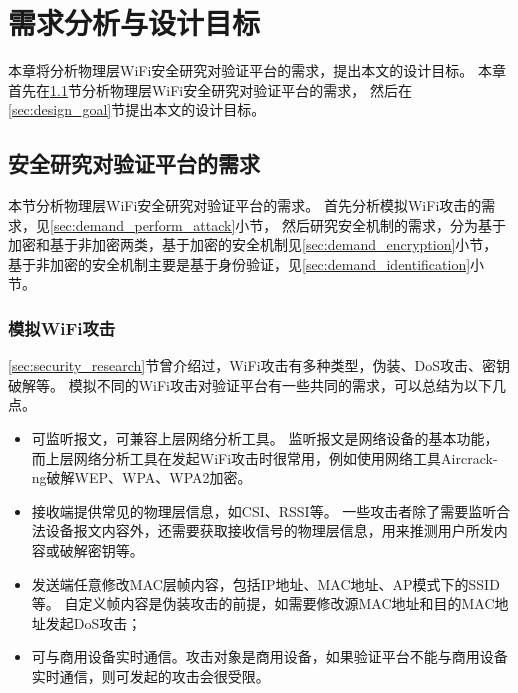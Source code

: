 
\chapter{需求分析与设计目标}
本章将分析物理层WiFi安全研究对验证平台的需求，提出本文的设计目标。
本章首先在\ref{sec:platform_demand}节分析物理层WiFi安全研究对验证平台的需求，
然后在\ref{sec:design_goal}节提出本文的设计目标。

	\section{安全研究对验证平台的需求}\label{sec:platform_demand}
	本节分析物理层WiFi安全研究对验证平台的需求。
	首先分析模拟WiFi攻击的需求，见\ref{sec:demand_perform_attack}小节，
	然后研究安全机制的需求，分为基于加密和基于非加密两类，基于加密的安全机制见\ref{sec:demand_encryption}小节，
	基于非加密的安全机制主要是基于身份验证，见\ref{sec:demand_identification}小节。

		\subsection{模拟WiFi攻击}\label{subsec:demand_perform_attack}
		\ref{sec:security_research}节曾介绍过，WiFi攻击有多种类型，伪装、DoS攻击、密钥破解等。
		模拟不同的WiFi攻击对验证平台有一些共同的需求，可以总结为以下几点。
		\begin{itemize}
			\item 可监听报文，可兼容上层网络分析工具。
			监听报文是网络设备的基本功能，而上层网络分析工具在发起WiFi攻击时很常用，例如使用网络工具Aircrack-ng破解WEP、WPA、WPA2加密\cite{ijarcet12wpa2}。
			\item 接收端提供常见的物理层信息，如CSI、RSSI等。
			一些攻击者除了需要监听合法设备报文内容外，还需要获取接收信号的物理层信息，用来推测用户所发内容\cite{ccs16csi}或破解密钥\cite{cns15key}等。
			\item 发送端任意修改MAC层帧内容，包括IP地址、MAC地址、AP模式下的SSID等。
			自定义帧内容是伪装攻击的前提，如需要修改源MAC地址和目的MAC地址发起DoS攻击\cite{wisec06spoofing}；
			\item 可与商用设备实时通信。攻击对象是商用设备，如果验证平台不能与商用设备实时通信，则可发起的攻击会很受限。
		\end{itemize}

